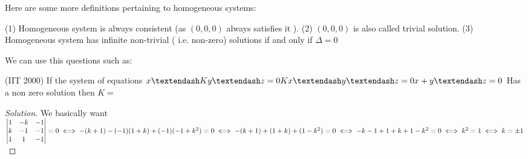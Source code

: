 Here are some more definitions pertaining to homogeneous systems:\\
\begin{theorem}
(1) Homogeneous system is always consistent (as $(0, 0, 0)$
always satisfies it ). 
(2) $(0, 0, 0)$ is also called trivial solution.
(3) Homogeneous system has infinite non-trivial ( i.e. non-zero) solutions if and only if $\Delta = 0$
\end{theorem}
We can use this questions such as:\\
\begin{example}
(IIT 2000)
    If the system of equations
$x – Ky – z = 0\\
Kx – y – z = 0 \\
x + y – z = 0$
Has a non zero solution then $K =$
\end{example}
\begin{proof}
    [Solution]
    We basically want $\begin{vmatrix}
        1 & -k & -1\\
        k & -1 & -1\\
        1 & 1 & -1\\
    \end{vmatrix} =0\\
    \iff -(k+1)-(-1)(1+k)+(-1)(-1+k^2)=0\\
    \iff -(k+1)+(1+k)+(1-k^2)=0\\
    \iff -k-1+1+k+1-k^2=0\\
    \iff k^2=1\\
    \iff k=\pm 1$
\end{proof}
